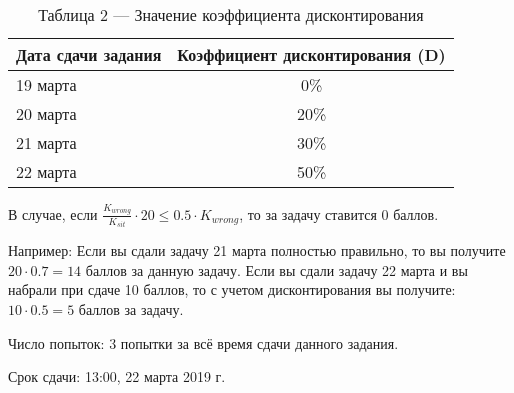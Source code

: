 \begin{table}[H]
    \caption{Таблица 2 — Значение коэффициента дисконтирования}
    \begin{tabular}{|l|c|}
    \hline
    Дата сдачи задания & Коэффициент дисконтирования (D) \\
    \hline
    19 марта & 0\% \\
    20 марта & 20\% \\
    21 марта & 30\% \\
    22 марта & 50\% \\
    \hline
    \end{tabular}
\end{table}

В случае, если $\frac{K_{wrong}}{K_{sit}} \cdot 20 \leq 0.5\cdot K_{wrong}$, то за задачу ставится 0 баллов.

Например:  
Если вы сдали задачу 21 марта полностью правильно, то вы получите $20 \cdot 0.7 = 14$ баллов за данную задачу. 
Если вы сдали задачу 22 марта и вы набрали при сдаче 10 баллов, то с учетом дисконтирования вы получите: $10 \cdot 0.5 = 5$ баллов за задачу.

Число попыток: 3 попытки за всё время сдачи данного задания.

Срок сдачи: 13:00, 22 марта 2019 г.